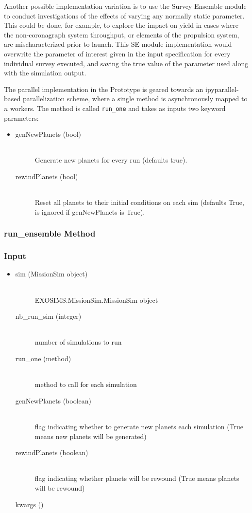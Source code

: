 \documentclass[cleanfoot]{asme2ej}
\begin{document}
Another possible implementation variation is to use the Survey Ensemble module to conduct investigations of the effects of varying any normally static parameter.  This could be done, for example, to explore the impact on yield in cases where the non-coronagraph system throughput, or elements of the propulsion system, are mischaracterized prior to launch.  This SE module implementation would overwrite the parameter of interest given in the input specification for every individual survey executed, and saving the true value of the parameter used along with the simulation output.

The parallel implementation in the Prototype is geared towards an ipyparallel-based parallelization scheme, where a single method is asynchronously mapped to $n$ workers.  The method is called \verb+run_one+ and takes as inputs two keyword parameters:

\begin{itemize}
\item 
\begin{description}
    \item[genNewPlanets (bool)] \hfill \\ Generate new planets for every run (defaults true).
    \item[rewindPlanets (bool)] \hfill \\ Reset all planets to their initial conditions on each sim (defaults True, is ignored if genNewPlanets is True).
\end{description}
\end{itemize}

\subsubsection{run\_ensemble Method} \label{}
\subsubsection*{Input}
\begin{itemize}
\item
\begin{description}
    \item[sim (MissionSim object)] \hfill \\ EXOSIMS.MissionSim.MissionSim object
    \item[nb\_run\_sim (integer)] \hfill \\ number of simulations to run
    \item[run\_one (method)] \hfill \\ method to call for each simulation
    \item[genNewPlanets (boolean)] \hfill \\ flag indicating whether to generate new planets each simulation (True means new planets will be generated)
    \item[rewindPlanets (boolean)] \hfill \\ flag indicating whether planets will be rewound (True means planets will be rewound)
    \item[kwargs ()] \hfill \\
\end{description}
\end{itemize}
\end{document}
